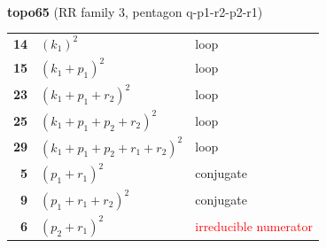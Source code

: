 \documentclass[10pt]{article}
\begin{document}
\begin{minipage}[t]{0.48\textwidth}
{}\\[2mm]\textbf{topo65} (RR family 3, pentagon q-p1-r2-p2-r1)\\[2pt]{\footnotesize\begin{tabular}{@{}r@{\ \ }l@{\ \ }l@{}}\textbf{14} & $(k_1)^2$ & loop\\
\textbf{15} & $(k_1+p_1)^2$ & loop\\
\textbf{23} & $(k_1+p_1+r_2)^2$ & loop\\
\textbf{25} & $(k_1+p_1+p_2+r_2)^2$ & loop\\
\textbf{29} & $(k_1+p_1+p_2+r_1+r_2)^2$ & loop\\
\textbf{5} & $(p_1+r_1)^2$ & conjugate\\
\textbf{9} & $(p_1+r_1+r_2)^2$ & conjugate\\
\textbf{6} & $(p_2+r_1)^2$ & \textcolor{red}{irreducible numerator}\\\end{tabular}}\end{minipage}\hfill%
\end{document}
